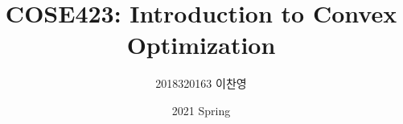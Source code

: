 

\title{COSE423: Introduction to Convex Optimization}
\author{2018320163 이찬영}
\date{2021 Spring}


    \maketitle
    \tableofcontents
    
    
    
    
    
    
    

